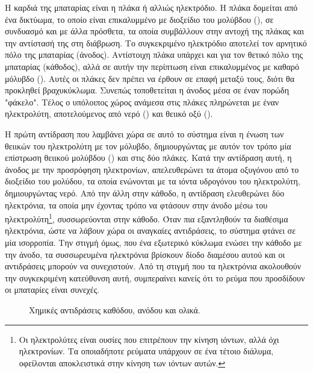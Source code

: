 \documentclass[12pt]{report}
\begin{document}
Η καρδιά της μπαταρίας είναι η πλάκα ή αλλιώς ηλεκτρόδιο.
Η πλάκα δομείται από ένα δικτύωμα, το οποίο είναι επικαλυμμένο με διοξείδιο του μολύβδου ({}), σε συνδυασμό και με άλλα πρόσθετα, τα οποία συμβάλλουν στην αντοχή της πλάκας και την αντίστασή της στη διάβρωση. 
Το συγκεκριμένο ηλεκτρόδιο αποτελεί τον αρνητικό πόλο της μπαταρίας (άνοδος). Αντίστοιχη πλάκα υπάρχει και για τον θετικό πόλο της μπαταρίας (κάθοδος), 
αλλά σε αυτήν την περίπτωση είναι επικαλυμμένος με καθαρό μόλυβδο ({}). Αυτές οι πλάκες δεν πρέπει να 
έρθουν σε επαφή μεταξύ τους, διότι θα προκληθεί βραχυκύκλωμα. Συνεπώς τοποθετείται η άνοδος μέσα σε έναν πορώδη "φάκελο". 
Τέλος ο υπόλοιπος χώρος ανάμεσα στις πλάκες πληρώνεται με έναν ηλεκτρολύτη, αποτελούμενος από νερό ({}) και θειικό οξύ ({}).

Η πρώτη αντίδραση που λαμβάνει χώρα σε αυτό το σύστημα είναι η ένωση των θειικών του ηλεκτρολύτη με τον μόλυβδο, δημιουργώντας με αυτόν τον τρόπο μία επίστρωση θειικού μολύβδου ({}) και στις δύο πλάκες. 
Κατά την αντίδραση αυτή, η άνοδος με την προσρόφηση ηλεκτρονίων, απελευθερώνει τα άτομα οξυγόνου από το διοξείδιο του μολύδου, τα οποία ενώνονται με τα ιόντα υδρογόνου του ηλεκτρολύτη, δημιουργώντας νερό. Από την άλλη στην κάθοδο,
η αντίδραση ελευθερώνει δύο ηλεκτρόνια, τα οποία μην έχοντας τρόπο να φτάσουν στην άνοδο μέσω του ηλεκτρολύτη\footnote{Οι ηλεκτρολύτες είναι ουσίες που επιτρέπουν την κίνηση ιόντων, αλλά όχι ηλεκτρονίων. Τα οποιαδήποτε ρεύματα
υπάρχουν σε ένα τέτοιο διάλυμα, οφείλονται αποκλειστικά στην κίνηση των ιόντων αυτών.}, συσσωρεύονται στην κάθοδο. Όταν πια εξαντληθούν τα διαθέσιμα ηλεκτρόνια, ώστε να λάβουν χώρα οι αναγκαίες αντιδράσεις, το σύστημα φτάνει σε
μία ισορροπία. Την στιγμή όμως, που ένα εξωτερικό κύκλωμα ενώσει την κάθοδο με την άνοδο, τα συσσωρευμένα ηλεκτρόνια βρίσκουν δίοδο διαμέσου αυτού και οι αντιδράσεις μπορούν να συνεχιστούν. Από τη στιγμή που τα ηλεκτρόνια ακολουθούν
την συγκεκριμένη κατεύθυνση αυτή, συμπεραίνει κανείς ότι το ρεύμα που προσδίδουν οι μπαταρίες είναι συνεχές.

\begin{figure}[h]
				\center
				{}
				\captionsetup{width=0.8\textwidth}
				\caption{Χημικές αντιδράσεις καθόδου, ανόδου και ολικά.}
				\label{eq:battery}
\end{figure}
\end{document}
